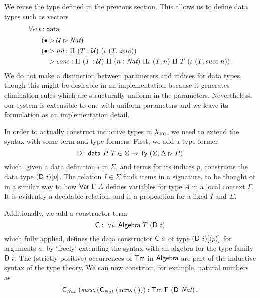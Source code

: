 We reuse the  type defined in the previous section. This allows us
to define data types such as vectors
\begin{align*}
	 & \textit{Vect} : \textsf{data}                                                                                                        \\
	 & \quad\begin{aligned}
		        \quad (\bullet & \rhd \mathcal{U} \rhd \textit{Nat})\                                                                               \\
		        \quad (\bullet & \rhd \textit{nil} : \Pi\ (T : \mathcal{U})\ (\iota\ (T, \textit{zero}))                                                          \\
		        \quad          & \rhd \textit{cons} : \Pi\ (T : \mathcal{U})\ \Pi\ (n : \textit{Nat})\ \Pi\iota\ (T, n)\ \Pi\ T\ (\iota\ (T, \textit{succ}\ n)) \,.
	        \end{aligned}
\end{align*}
We do not make a distinction between parameters and indices for data types, though this might
be desirable in an implementation because it generates elimination rules which
are structurally uniform in the parameters. Nevertheless, our system is
extensible to one with uniform parameters and we leave its formulation as an
implementation detail.

In order to actually construct inductive types in $\lambda_{\textsc{ind}}$, we need to
extend the syntax with some term and type formers. First, we add a type former
\[
	\mta{D} : \mta{data}\ P\ T \in \Sigma \to \Ty\ (\Sigma, \Delta \rhd P)
\]
which, given a data definition $i$ in $\Sigma$, and terms for its
indices $p$, constructs the data type $(\mta{D}\ i)[p]$. The relation $I \in
\Sigma$ finds items in a signature, to be thought of in a similar way to how
$\mta{Var}\ \Gamma\ A$ defines variables for type $A$ in a local context
$\Gamma$. It is evidently a decidable relation, and is a proposition for a fixed
$I$ and $\Sigma$.

Additionally, we add a constructor term
\[
	\mta{C} :\ \forall i.\ \mta{Algebra}\ T\ (\mta{D}\ i)
\]
which fully applied, defines the data constructor $\textsf{C}\ a$ of type
$(\textsf{D}\ i)[\langle p\rangle]$ for arguments $a$, by `freely' extending the syntax with
an algebra for the type family $\textsf{D}\ i$. The (strictly positive) occurrences
of $\textsf{Tm}$ in $\textsf{Algebra}$ are part of the inductive syntax of the type
theory. We can now construct, for example, natural numbers as
\[
    \mta{C}_{\textit{Nat}}\ (\textit{succ}, (\mta{C}_{\textit{Nat}}\ (\textit{zero}, (\,))) : \mta{Tm}\ \Gamma\ (\mta{D}\ \textit{Nat}) \,.
\]

